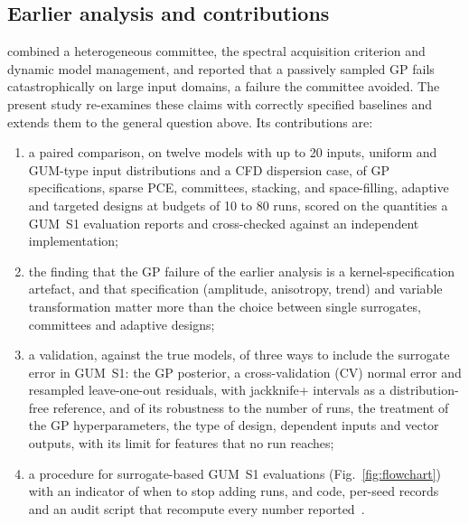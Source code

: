 \subsection{Earlier analysis and contributions}
combined a heterogeneous committee,
the spectral acquisition criterion and dynamic model management, and
reported that a passively sampled GP fails catastrophically on large input
domains, a failure the committee avoided. The present study re-examines
these claims with correctly specified baselines and extends them to the
general question above. Its contributions are:
\begin{enumerate}\setlength\itemsep{1pt}
\item a paired comparison, on twelve models with up to 20 inputs, uniform
and GUM-type input distributions
and a CFD dispersion case, of GP specifications, sparse PCE, committees,
stacking, and space-filling, adaptive and targeted designs at budgets of 10
to 80 runs, scored on the quantities a GUM~S1 evaluation reports and
cross-checked against an independent implementation;
\item the finding that the GP failure of the earlier analysis is a
kernel-specification artefact, and that specification (amplitude,
anisotropy, trend) and variable transformation matter more than the choice
between single surrogates, committees and adaptive designs;
\item a validation, against the true models, of three ways to include the
surrogate error in GUM~S1: the GP posterior, a cross-validation (CV)
normal error and resampled leave-one-out residuals, with jackknife+
intervals as a distribution-free reference, and of its robustness to the
number of runs, the treatment of the GP hyperparameters, the type of design,
dependent inputs and vector outputs, with its limit for features that no
run reaches;
\item a procedure for surrogate-based GUM~S1 evaluations
(Fig.~\ref{fig:flowchart}) with an indicator of when to stop adding runs,
and code, per-seed records and an audit script that recompute every number
reported~\repocite.
\end{enumerate}
